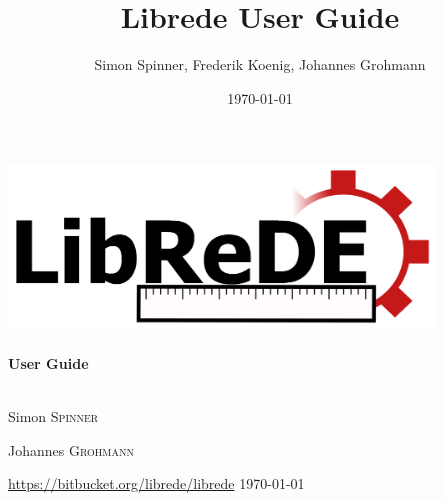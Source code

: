 \begin{titlepage}
\begin{center}


\title{Librede User Guide}
\date{{\large \today}
	}
\author{Simon Spinner, Frederik Koenig, Johannes Grohmann}

   



\includegraphics[width=0.85\textwidth]{../Icon/LibRedeLogo-high.png}\\[1cm] 

\HRule \\[0.4cm]
{ \huge \bfseries User Guide}\\[0.4cm]
\HRule \\[1.5cm]

\begin{minipage}{0.4\textwidth}
	\begin{flushleft} \large
		Simon \textsc{Spinner}
	\end{flushleft}
\end{minipage}
\hfill
\begin{minipage}{0.4\textwidth}
	\begin{flushright} \large
		Johannes \textsc{Grohmann}
	\end{flushright}
\end{minipage}

\vfill
\centering
\hspace{2cm}\url{https://bitbucket.org/librede/librede}
\newline
\newline
{\large \today}

\end{center}
\end{titlepage}